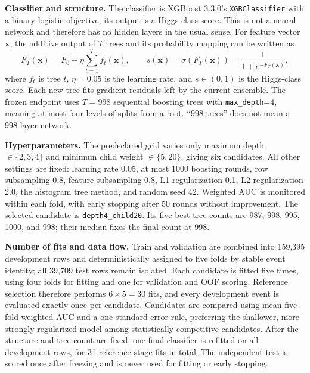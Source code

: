 \documentclass[11pt,a4paper]{article}
\begin{document}
\textbf{Classifier and structure.} The classifier is XGBoost 3.3.0's \texttt{XGBClassifier} with a binary-logistic objective; its output is a Higgs-class score. This is not a neural network and therefore has no hidden layers in the usual sense. For feature vector $\mathbf{x}$, the additive output of $T$ trees and its probability mapping can be written as
\begin{equation}
F_T(\mathbf{x})=F_0+\eta\sum_{t=1}^{T}f_t(\mathbf{x}),
\qquad
s(\mathbf{x})=\sigma\!\left(F_T(\mathbf{x})\right)
=\frac{1}{1+e^{-F_T(\mathbf{x})}},
\end{equation}
where $f_t$ is tree $t$, $\eta=0.05$ is the learning rate, and $s\in(0,1)$ is the Higgs-class score. Each new tree fits gradient residuals left by the current ensemble. The frozen endpoint uses $T=998$ sequential boosting trees with \texttt{max\_depth}=4, meaning at most four levels of splits from a root. ``998 trees'' does not mean a 998-layer network.

\textbf{Hyperparameters.} The predeclared grid varies only maximum depth $\in\{2,3,4\}$ and minimum child weight $\in\{5,20\}$, giving six candidates. All other settings are fixed: learning rate 0.05, at most 1000 boosting rounds, row subsampling 0.8, feature subsampling 0.8, L1 regularization 0.1, L2 regularization 2.0, the histogram tree method, and random seed 42. Weighted AUC is monitored within each fold, with early stopping after 50 rounds without improvement. The selected candidate is \texttt{depth4\_child20}. Its five best tree counts are 987, 998, 995, 1000, and 998; their median fixes the final count at 998.

\textbf{Number of fits and data flow.} Train and validation are combined into 159,395 development rows and deterministically assigned to five folds by stable event identity; all 39,709 test rows remain isolated. Each candidate is fitted five times, using four folds for fitting and one for validation and OOF scoring. Reference selection therefore performs $6\times5=30$ fits, and every development event is evaluated exactly once per candidate. Candidates are compared using mean five-fold weighted AUC and a one-standard-error rule, preferring the shallower, more strongly regularized model among statistically competitive candidates. After the structure and tree count are fixed, one final classifier is refitted on all development rows, for 31 reference-stage fits in total. The independent test is scored once after freezing and is never used for fitting or early stopping.
\end{document}
